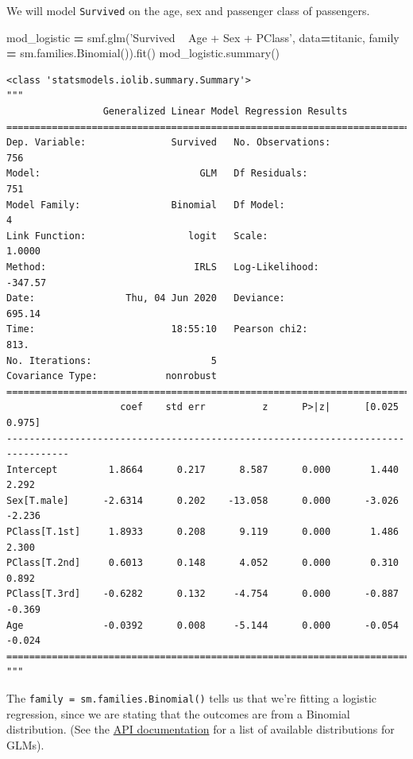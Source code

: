 \documentclass[
  letterpaper,
]{scrbook}
\newenvironment{Shaded}{\begin{snugshade}}{\end{snugshade}}
\newcommand{\NormalTok}[1]{#1}
\newcommand{\OperatorTok}[1]{\textcolor[rgb]{0.81,0.36,0.00}{\textbf{#1}}}
\newcommand{\StringTok}[1]{\textcolor[rgb]{0.31,0.60,0.02}{#1}}
\begin{document}
We will model \texttt{Survived} on the age, sex and passenger class of passengers.

\begin{Shaded}
\begin{Highlighting}[]
\NormalTok{mod_logistic }\OperatorTok{=}\NormalTok{ smf.glm(}\StringTok{'Survived ~ Age + Sex + PClass'}\NormalTok{, data}\OperatorTok{=}\NormalTok{titanic,}
\NormalTok{  family }\OperatorTok{=}\NormalTok{ sm.families.Binomial()).fit()}
\NormalTok{mod_logistic.summary()}
\end{Highlighting}
\end{Shaded}

\begin{verbatim}
<class 'statsmodels.iolib.summary.Summary'>
"""
                 Generalized Linear Model Regression Results                  
==============================================================================
Dep. Variable:               Survived   No. Observations:                  756
Model:                            GLM   Df Residuals:                      751
Model Family:                Binomial   Df Model:                            4
Link Function:                  logit   Scale:                          1.0000
Method:                          IRLS   Log-Likelihood:                -347.57
Date:                Thu, 04 Jun 2020   Deviance:                       695.14
Time:                        18:55:10   Pearson chi2:                     813.
No. Iterations:                     5                                         
Covariance Type:            nonrobust                                         
=================================================================================
                    coef    std err          z      P>|z|      [0.025      0.975]
---------------------------------------------------------------------------------
Intercept         1.8664      0.217      8.587      0.000       1.440       2.292
Sex[T.male]      -2.6314      0.202    -13.058      0.000      -3.026      -2.236
PClass[T.1st]     1.8933      0.208      9.119      0.000       1.486       2.300
PClass[T.2nd]     0.6013      0.148      4.052      0.000       0.310       0.892
PClass[T.3rd]    -0.6282      0.132     -4.754      0.000      -0.887      -0.369
Age              -0.0392      0.008     -5.144      0.000      -0.054      -0.024
=================================================================================
"""
\end{verbatim}

The \texttt{family\ =\ sm.families.Binomial()} tells us that we're fitting a logistic
regression, since we are stating that the outcomes are from a Binomial distribution. (See the \href{https://www.statsmodels.org/stable/glm.html\#families}{API documentation} for a list of available distributions for GLMs).
\end{document}
